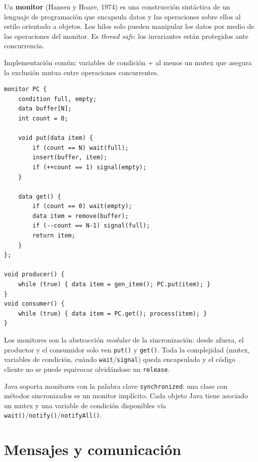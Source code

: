 \documentclass[11pt,a4paper]{article}
\begin{document}
\begin{definicion}
Un \textbf{monitor} (Hansen y Hoare, 1974) es una construcción
sintáctica de un lenguaje de programación que encapsula datos y las
operaciones sobre ellos al estilo orientado a objetos. Los hilos
solo pueden manipular los datos por medio de las operaciones del
monitor. Es \emph{thread safe}: los invariantes están protegidos
ante concurrencia.
\end{definicion}

Implementación común: variables de condición + al menos un mutex que
asegura la exclusión mutua entre operaciones concurrentes.

\begin{lstlisting}[style=cstyle]
monitor PC {
    condition full, empty;
    data buffer[N];
    int count = 0;

    void put(data item) {
        if (count == N) wait(full);
        insert(buffer, item);
        if (++count == 1) signal(empty);
    }

    data get() {
        if (count == 0) wait(empty);
        data item = remove(buffer);
        if (--count == N-1) signal(full);
        return item;
    }
};

void producer() {
    while (true) { data item = gen_item(); PC.put(item); }
}
void consumer() {
    while (true) { data item = PC.get(); process(item); }
}
\end{lstlisting}

\begin{idea}
Los monitores son la abstracción \emph{modular} de la sincronización:
desde afuera, el productor y el consumidor solo ven \texttt{put()} y
\texttt{get()}. Toda la complejidad (mutex, variables de condición,
cuándo \texttt{wait}/\texttt{signal}) queda encapsulada y el código
cliente no se puede equivocar olvidándose un \texttt{release}.
\end{idea}

Java soporta monitores con la palabra clave \texttt{synchronized}:
una clase con métodos sincronizados es un monitor implícito. Cada
objeto Java tiene asociado un mutex y una variable de condición
disponibles vía \texttt{wait()}/\texttt{notify()}/\texttt{notifyAll()}.

\section{Mensajes y comunicación}
\end{document}
